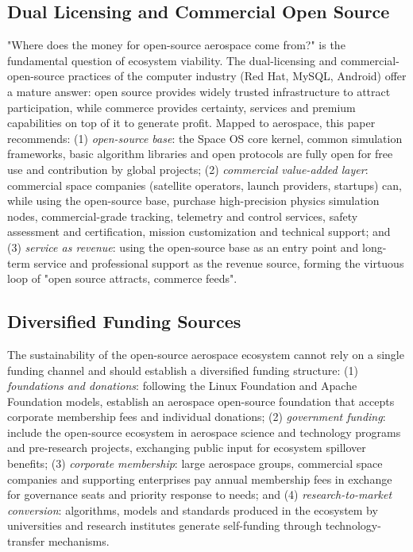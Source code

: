 \documentclass[11pt]{article}
\begin{document}
\subsection{Dual Licensing and Commercial Open Source}
"Where does the money for open-source aerospace come from?" is the fundamental question of ecosystem viability. The dual-licensing and commercial-open-source practices of the computer industry (Red Hat, MySQL, Android) offer a mature answer: open source provides widely trusted infrastructure to attract participation, while commerce provides certainty, services and premium capabilities on top of it to generate profit. Mapped to aerospace, this paper recommends: (1) \emph{open-source base}: the Space OS core kernel, common simulation frameworks, basic algorithm libraries and open protocols are fully open for free use and contribution by global projects; (2) \emph{commercial value-added layer}: commercial space companies (satellite operators, launch providers, startups) can, while using the open-source base, purchase high-precision physics simulation nodes, commercial-grade tracking, telemetry and control services, safety assessment and certification, mission customization and technical support; and (3) \emph{service as revenue}: using the open-source base as an entry point and long-term service and professional support as the revenue source, forming the virtuous loop of "open source attracts, commerce feeds".

\subsection{Diversified Funding Sources}
The sustainability of the open-source aerospace ecosystem cannot rely on a single funding channel and should establish a diversified funding structure: (1) \emph{foundations and donations}: following the Linux Foundation and Apache Foundation models, establish an aerospace open-source foundation that accepts corporate membership fees and individual donations; (2) \emph{government funding}: include the open-source ecosystem in aerospace science and technology programs and pre-research projects, exchanging public input for ecosystem spillover benefits; (3) \emph{corporate membership}: large aerospace groups, commercial space companies and supporting enterprises pay annual membership fees in exchange for governance seats and priority response to needs; and (4) \emph{research-to-market conversion}: algorithms, models and standards produced in the ecosystem by universities and research institutes generate self-funding through technology-transfer mechanisms.
\end{document}
